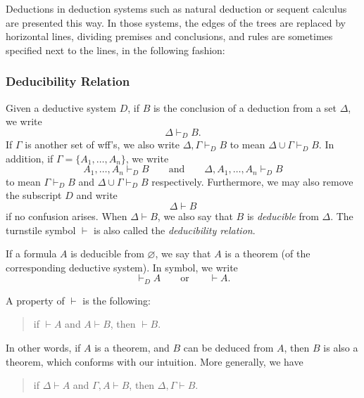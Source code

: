 \documentclass[12pt]{article}
\begin{document}
Deductions in deduction systems such as natural deduction or sequent calculus are presented this way.  In those systems,  the edges of the trees are replaced by horizontal lines, dividing premises and conclusions, and rules are sometimes specified next to the lines, in the following fashion:
\begin{prooftree}
\end{prooftree}

\subsubsection*{Deducibility Relation}

Given a deductive system $D$, if $B$ is the conclusion of a deduction from a set $\Delta$, we write $$\Delta \vdash_D B.$$
If $\Gamma$ is another set of wff's, we also write $\Delta, \Gamma \vdash_D B$ to mean $\Delta\cup\Gamma \vdash_D B$.  In addition, if $\Gamma =\lbrace A_1,\ldots, A_n\rbrace$, we write 
$$A_1,\ldots, A_n \vdash_D B \qquad \mbox{and} \qquad \Delta, A_1,\ldots, A_n \vdash_D B$$ 
to mean $\Gamma \vdash_D B$ and $\Delta\cup \Gamma \vdash_D B$ respectively.  Furthermore, we may also remove the subscript $D$ and write $$\Delta \vdash B$$ if no confusion arises.  When $\Delta \vdash B$, we also say that $B$ is \emph{deducible} from $\Delta$.  The turnstile symbol $\vdash$ is also called the 
\emph{deducibility relation}.

If a formula $A$ is deducible from $\varnothing$, we say that $A$ is a theorem (of the corresponding deductive system).  In symbol, we write $$\vdash_D A \qquad \mbox{or} \qquad \vdash A.$$

A property of $\vdash$ is the following: 
\begin{quote}\begin{center}
if $\vdash A$ and $A \vdash B$, then $\vdash B$.  
\end{center}\end{quote}
In other words, if $A$ is a theorem, and $B$ can be deduced from $A$, then $B$ is also a theorem, which conforms with our intuition.  More generally, we have
\begin{quote}\begin{center}
if $\Delta \vdash A$ and $\Gamma, A \vdash B$, then $\Delta, \Gamma \vdash B$.  
\end{center}\end{quote}
\end{document}
